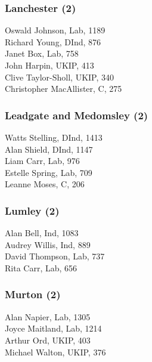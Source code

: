 \documentclass[a4paper,openany,10pt]{book}
\begin{document}
\subsubsection*{Lanchester (2)}



Oswald Johnson, Lab, 1189\\
Richard Young, DInd, 876\\
Janet Box, Lab, 758\\
John Harpin, UKIP, 413\\
Clive Taylor-Sholl, UKIP, 340\\
Christopher MacAllister, C, 275\\


\subsubsection*{Leadgate and Medomsley (2)}



Watts Stelling, DInd, 1413\\
Alan Shield, DInd, 1147\\
Liam Carr, Lab, 976\\
Estelle Spring, Lab, 709\\
Leanne Moses, C, 206\\


\subsubsection*{Lumley (2)}



Alan Bell, Ind, 1083\\
Audrey Willis, Ind, 889\\
David Thompson, Lab, 737\\
Rita Carr, Lab, 656\\


\subsubsection*{Murton (2)}



Alan Napier, Lab, 1305\\
Joyce Maitland, Lab, 1214\\
Arthur Ord, UKIP, 403\\
Michael Walton, UKIP, 376\\
\end{document}
